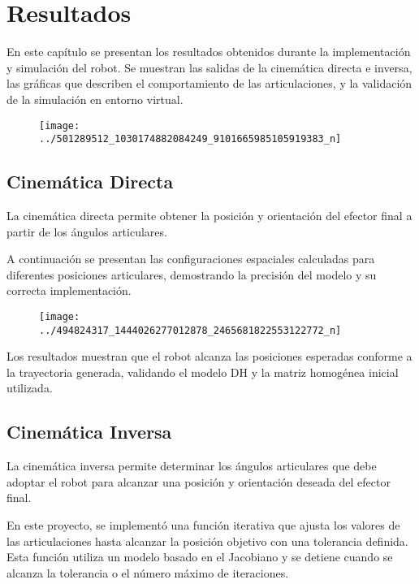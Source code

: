 \chapter{Resultados} \label{chap:resultados}
En este capítulo se presentan los resultados obtenidos durante la implementación y simulación del robot. Se muestran las salidas de la cinemática directa e inversa, las gráficas que describen el comportamiento de las articulaciones, y la validación de la simulación en entorno virtual.
\begin{figure}
	\centering
	\texttt{[image: ../501289512\_1030174882084249\_9101665985105919383\_n]}
	\caption{}
	\label{fig:50128951210301748820842499101665985105919383n}
\end{figure}



\section{Cinemática Directa}

La cinemática directa permite obtener la posición y orientación del efector final a partir de los ángulos articulares. 

A continuación se presentan las configuraciones espaciales calculadas para diferentes posiciones articulares, demostrando la precisión del modelo y su correcta implementación.


\begin{figure}
	\centering
	\texttt{[image: ../494824317\_1444026277012878\_2465681822553122772\_n]}
	\caption{}
	\label{fig:49482431714440262770128782465681822553122772n}
\end{figure}

Los resultados muestran que el robot alcanza las posiciones esperadas conforme a la trayectoria generada, validando el modelo DH y la matriz homogénea inicial utilizada.

\section{Cinemática Inversa}

La cinemática inversa permite determinar los ángulos articulares que debe adoptar el robot para alcanzar una posición y orientación deseada del efector final. 

En este proyecto, se implementó una función iterativa que ajusta los valores de las articulaciones hasta alcanzar la posición objetivo con una tolerancia definida. Esta función utiliza un modelo basado en el Jacobiano y se detiene cuando se alcanza la tolerancia o el número máximo de iteraciones.

